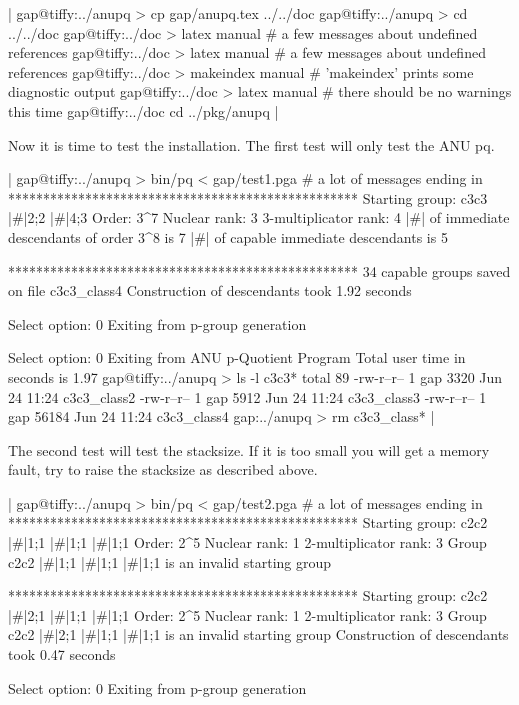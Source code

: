 |    gap@tiffy:../anupq > cp gap/anupq.tex ../../doc
    gap@tiffy:../anupq > cd ../../doc
    gap@tiffy:../doc > latex manual
    # a few messages about undefined references
    gap@tiffy:../doc > latex manual
    # a few messages about undefined references
    gap@tiffy:../doc > makeindex manual
    # 'makeindex' prints some diagnostic output
    gap@tiffy:../doc > latex manual
    # there should be no warnings this time
    gap@tiffy:../doc cd ../pkg/anupq |

Now it is time to test  the installation.  The  first test will only test
the ANU pq.

|    gap@tiffy:../anupq > bin/pq < gap/test1.pga
    # a lot of messages ending in
    **************************************************
    Starting group: c3c3 |\#|2;2 |\#|4;3
    Order: 3^7
    Nuclear rank: 3
    3-multiplicator rank: 4
    |\#| of immediate descendants of order 3^8 is 7
    |\#| of capable immediate descendants is 5

    **************************************************
    34 capable groups saved on file c3c3_class4
    Construction of descendants took 1.92 seconds

    Select option: 0 
    Exiting from p-group generation

    Select option: 0 
    Exiting from ANU p-Quotient Program
    Total user time in seconds is 1.97
    gap@tiffy:../anupq > ls -l c3c3*
    total 89
    -rw-r--r--    1 gap    3320 Jun 24 11:24 c3c3_class2
    -rw-r--r--    1 gap    5912 Jun 24 11:24 c3c3_class3
    -rw-r--r--    1 gap   56184 Jun 24 11:24 c3c3_class4
    gap:../anupq > rm c3c3_class* |

The second test will test the stacksize. If it is too small you will  get
a memory fault, try to raise the stacksize as described above.

|    gap@tiffy:../anupq > bin/pq < gap/test2.pga
    # a lot of messages ending in
    **************************************************
    Starting group: c2c2 |\#|1;1 |\#|1;1 |\#|1;1
    Order: 2^5
    Nuclear rank: 1
    2-multiplicator rank: 3
    Group c2c2 |\#|1;1 |\#|1;1 |\#|1;1 is an invalid starting group

    **************************************************
    Starting group: c2c2 |\#|2;1 |\#|1;1 |\#|1;1
    Order: 2^5
    Nuclear rank: 1
    2-multiplicator rank: 3
    Group c2c2 |\#|2;1 |\#|1;1 |\#|1;1 is an invalid starting group
    Construction of descendants took 0.47 seconds

    Select option: 0 
    Exiting from p-group generation

